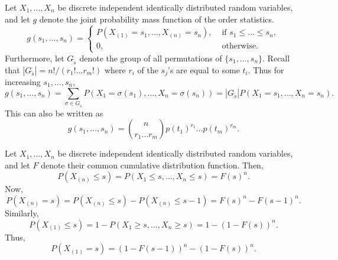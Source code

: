 \documentclass[11pt]{article}
\theoremstyle{definition}
\theoremstyle{remark}
\numberwithin{equation}{module}
\begin{document}
    \begin{theorem}
        Let $X_1, \dots, X_n$ be discrete independent identically distributed random
        variables, and let $g$ denote the joint probability mass function of the
        order statistics. \[
            g(s_1, \dots, s_n) = \begin{cases}
                P(X_{(1)} = s_1, \dots, X_{(n)} = s_n), &\text{ if }s_1 \leq \dots
                \leq s_n, \\
                0, &\text{ otherwise}.
            \end{cases}
        \] Furthermore, let $G_{\tilde{s}}$ denote the group of all permutations of
        $\{s_1, \dots, s_n\}$. Recall that $|G_{\tilde{s}}| = n! / (r_1!\dots r_m!)$
        where $r_i$ of the $s_j$'s are equal to some $t_i$. Thus for increasing
        $s_1, \dots, s_n$, \[
            g(s_1, \dots, s_n) = \sum_{\sigma \in G_{\tilde{s}}} P(X_1 =
            \sigma(s_1), \dots, X_n = \sigma(s_n)) = |G_{\tilde{s}}|P(X_1 = s_1,
            \dots, X_n = s_n).
        \] This can also be written as \[
            g(s_1, \dots, s_n) = \binom{n}{r_1 \dots r_m}p(t_1)^{r_1} \dots
            p(t_m)^{r_m}.
        \] 
    \end{theorem}
    \begin{theorem}
        Let $X_1, \dots, X_n$ be discrete independent identically distributed random
        variables, and let $F$ denote their common cumulative distribution function.
        Then, \[
            P(X_{(n)} \leq s) = P(X_1 \leq s, \dots, X_n \leq s) = F(s)^n.
        \] Now, \[
            P(X_{(n)} = s) = P(X_{(n)} \leq s) - P(X_{(n)} \leq s - 1) = F(s)^n -
            F(s - 1)^n.
        \] Similarly, \[
            P(X_{(1)} \leq s) = 1 - P(X_1 \geq s, \dots, X_n \geq s) = 1 - (1 -
            F(s))^n.
        \] Thus, \[
            P(X_{(1)} = s) = (1 - F(s - 1))^n - (1 - F(s))^n.
        \]  
    \end{theorem}
    
\end{document}
